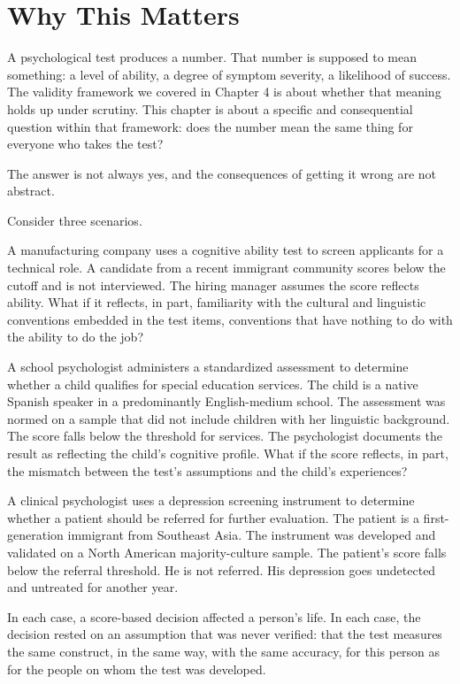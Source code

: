 \documentclass[
  11pt,
  letterpaper,
]{scrbook}
\begin{document}
\section{Why This Matters}\label{why-this-matters}

A psychological test produces a number. That number is supposed to mean
something: a level of ability, a degree of symptom severity, a
likelihood of success. The validity framework we covered in Chapter 4 is
about whether that meaning holds up under scrutiny. This chapter is
about a specific and consequential question within that framework: does
the number mean the same thing for everyone who takes the test?

The answer is not always yes, and the consequences of getting it wrong
are not abstract.

Consider three scenarios.

A manufacturing company uses a cognitive ability test to screen
applicants for a technical role. A candidate from a recent immigrant
community scores below the cutoff and is not interviewed. The hiring
manager assumes the score reflects ability. What if it reflects, in
part, familiarity with the cultural and linguistic conventions embedded
in the test items, conventions that have nothing to do with the ability
to do the job?

A school psychologist administers a standardized assessment to determine
whether a child qualifies for special education services. The child is a
native Spanish speaker in a predominantly English-medium school. The
assessment was normed on a sample that did not include children with her
linguistic background. The score falls below the threshold for services.
The psychologist documents the result as reflecting the child's
cognitive profile. What if the score reflects, in part, the mismatch
between the test's assumptions and the child's experiences?

A clinical psychologist uses a depression screening instrument to
determine whether a patient should be referred for further evaluation.
The patient is a first-generation immigrant from Southeast Asia. The
instrument was developed and validated on a North American
majority-culture sample. The patient's score falls below the referral
threshold. He is not referred. His depression goes undetected and
untreated for another year.

In each case, a score-based decision affected a person's life. In each
case, the decision rested on an assumption that was never verified: that
the test measures the same construct, in the same way, with the same
accuracy, for this person as for the people on whom the test was
developed.
\end{document}
